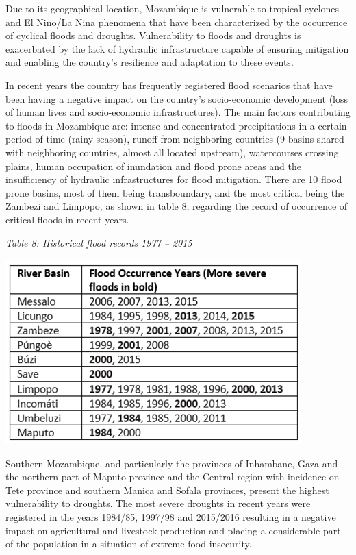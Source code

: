 \documentclass[
]{book}
\begin{document}
Due to its geographical location, Mozambique is vulnerable to tropical cyclones and El Nino/La Nina phenomena that have been characterized by the occurrence of cyclical floods and droughts. Vulnerability to floods and droughts is exacerbated by the lack of hydraulic infrastructure capable of ensuring mitigation and enabling the country's resilience and adaptation to these events.

In recent years the country has frequently registered flood scenarios that have been having a negative impact on the country's socio-economic development (loss of human lives and socio-economic infrastructures). The main factors contributing to floods in Mozambique are: intense and concentrated precipitations in a certain period of time (rainy season), runoff from neighboring countries (9 basins shared with neighboring countries, almost all located upstream), watercourses crossing plains, human occupation of inundation and flood prone areas and the insufficiency of hydraulic infrastructures for flood mitigation. There are 10 flood prone basins, most of them being transboundary, and the most critical being the Zambezi and Limpopo, as shown in table 8, regarding the record of occurrence of critical floods in recent years.

\emph{Table 8: Historical flood records 1977 -- 2015}

\includegraphics{Figure34.png}

Southern Mozambique, and particularly the provinces of Inhambane, Gaza and the northern part of Maputo province and the Central region with incidence on Tete province and southern Manica and Sofala provinces, present the highest vulnerability to droughts. The most severe droughts in recent years were registered in the years 1984/85, 1997/98 and 2015/2016 resulting in a negative impact on agricultural and livestock production and placing a considerable part of the population in a situation of extreme food insecurity.
\end{document}
